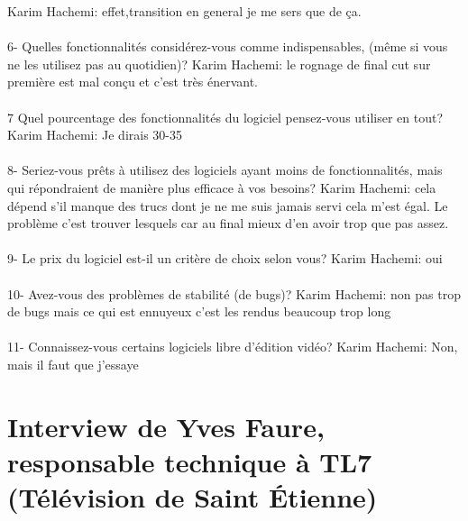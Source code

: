Karim Hachemi: effet,transition en general je me sers que de ça.

\paragraph{}
6-  Quelles fonctionnalités considérez-vous comme indispensables, (même si vous
ne les utilisez pas au quotidien)?
Karim Hachemi: le rognage de final cut sur première est mal conçu et c'est très
énervant.

\paragraph{}
7 Quel pourcentage des fonctionnalités du logiciel pensez-vous utiliser
en tout?
Karim Hachemi: Je dirais 30-35%

\paragraph{}
8- Seriez-vous prêts à utilisez des logiciels ayant moins de fonctionnalités,
mais qui répondraient de manière plus efficace à vos besoins?
Karim Hachemi: cela dépend s'il manque des trucs dont je ne me
suis jamais servi cela m'est égal. Le problème c'est
trouver lesquels car au final mieux d'en avoir trop que pas assez.

\paragraph{}
9-  Le prix du logiciel est-il un critère de choix selon vous?
Karim Hachemi: oui

\paragraph{}
10- Avez-vous des problèmes de stabilité (de bugs)?
Karim Hachemi: non pas trop de bugs mais ce qui est ennuyeux c'est les
rendus beaucoup trop long

\paragraph{}
11- Connaissez-vous certains logiciels libre d'édition vidéo?
Karim Hachemi: Non, mais il faut que j'essaye

\section{Interview de Yves Faure,  responsable technique à TL7
(Télévision de Saint Étienne)}

